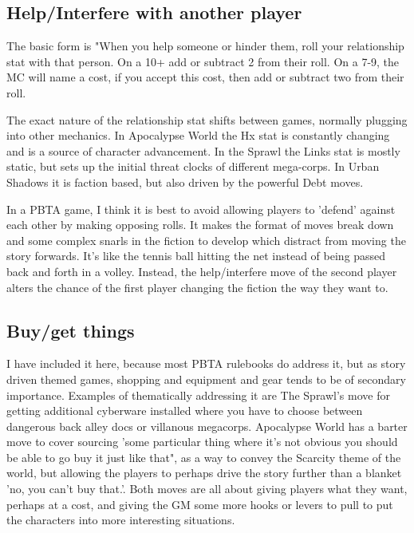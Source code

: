 \documentclass{tufte-handout}
\begin{document}
\subsection{Help/Interfere with another player}
The basic form is "When you help someone or hinder them, roll your relationship stat with that person. On a 10+ add or subtract 2 from their roll. On a 7-9, the MC will name a cost, if you accept this cost, then add or subtract two from their roll.

The exact nature of the relationship stat shifts between games, normally plugging into other mechanics. In Apocalypse World the Hx stat is constantly changing and is a source of character advancement. In the Sprawl the Links stat is mostly static, but sets up the initial threat clocks of different mega-corps. In Urban Shadows it is faction based, but also driven by the powerful Debt moves.

In a PBTA game, I think it is best to avoid allowing players to 'defend' against each other by making opposing rolls. It makes the format of moves break down and some complex snarls in the fiction to develop which distract from moving the story forwards. It's like the tennis ball hitting the net instead of being passed back and forth in a volley. Instead, the help/interfere move of the second player alters the chance of the first player changing the fiction the way they want to.

\subsection{Buy/get things}
I have included it here, because most PBTA rulebooks do address it, but as story driven themed games, shopping and equipment and gear tends to be of secondary importance. Examples of thematically addressing it are The Sprawl's move for getting additional cyberware installed where you have to choose between dangerous back alley docs or villanous megacorps. 
Apocalypse World has a barter move to cover sourcing 'some particular thing where it's not obvious you should be able to go buy it just like that", as a way to convey the Scarcity theme of the world, but allowing the players to perhaps drive the story further than a blanket 'no, you can't buy that.'. 
Both moves are all about giving players what they want, perhaps at a cost, and giving the GM some more hooks or levers to pull to put the characters into more interesting situations.
\end{document}
